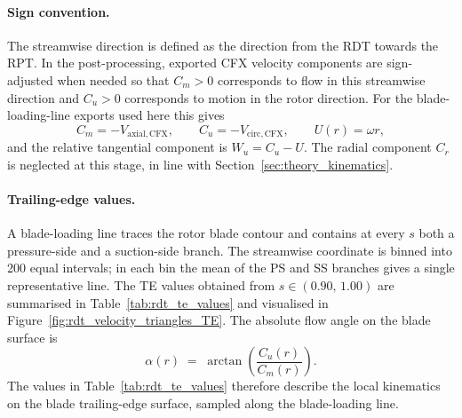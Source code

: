 \paragraph{Sign convention.}
The streamwise direction is defined as the direction from the RDT towards the RPT. In the post-processing, exported CFX velocity components are sign-adjusted when needed so that $C_m>0$ corresponds to flow in this streamwise direction and $C_u>0$ corresponds to motion in the rotor direction. For the blade-loading-line exports used here this gives
\begin{equation}
C_m = -V_{\mathrm{axial,CFX}}, \qquad
C_u = -V_{\mathrm{circ,CFX}}, \qquad
U(r)=\omega r,
\label{eq:rdt_sign_convention}
\end{equation}
and the relative tangential component is $W_u=C_u-U$. The radial component $C_r$ is neglected at this stage, in line with Section~\ref{sec:theory_kinematics}.
 
\paragraph{Trailing-edge values.}
A blade-loading line traces the rotor blade contour and contains at every $s$ both a pressure-side and a suction-side branch. The streamwise coordinate is binned into 200 equal intervals; in each bin the mean of the PS and SS branches gives a single representative line. The TE values obtained from $s\in(0.90,\,1.00)$ are summarised in Table~\ref{tab:rdt_te_values} and visualised in Figure~\ref{fig:rdt_velocity_triangles_TE}. The absolute flow angle on the blade surface is
\begin{equation}
\alpha(r) \;=\; \arctan\!\left(\frac{C_u(r)}{C_m(r)}\right).
\label{eq:alpha_definition}
\end{equation}
The values in Table~\ref{tab:rdt_te_values} therefore describe the local kinematics on the blade trailing-edge surface, sampled along the blade-loading line.
 

